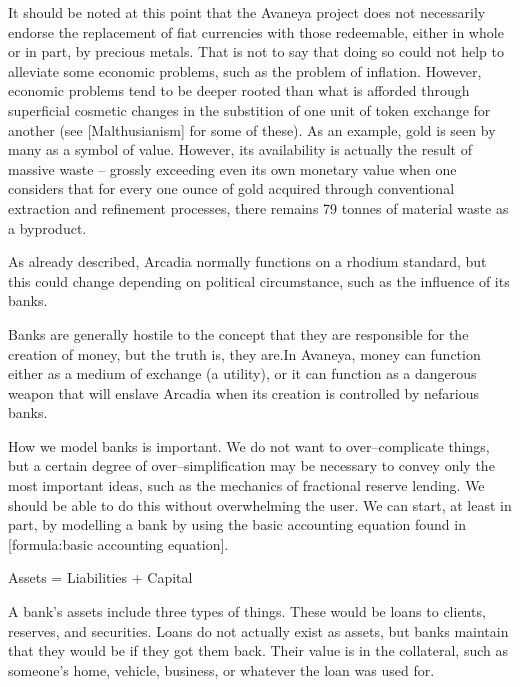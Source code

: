 It should be noted at this point that the Avaneya project does not necessarily endorse the replacement of fiat currencies with those redeemable, either in whole or in part, by precious metals. That is not to say that doing so could not help to alleviate some economic problems, such as the problem of inflation. However, economic problems tend to be deeper rooted than what is afforded through superficial cosmetic changes in the substition of one unit of token exchange for another (see [Malthusianism] for some of these). As an example, gold is seen by many as a symbol of value. However, its availability is actually the result of massive waste -- grossly exceeding even its own monetary value when one considers that for every one ounce of gold acquired through conventional extraction and refinement processes, there remains 79 tonnes of material waste as a byproduct.\footnotecite[oxfam2004]


As already described, Arcadia normally functions on a rhodium standard, but this could change depending on political circumstance, such as the influence of its banks.

Banks are generally hostile to the concept that they are responsible for the creation of money, but the truth is, they are. In Avaneya, money can function either as a medium of exchange (a utility), or it can function as a dangerous weapon that will enslave Arcadia when its creation is controlled by nefarious banks.

How we model banks is important. We do not want to over--complicate things, but a certain degree of over--simplification may be necessary to convey only the most important ideas, such as the mechanics of fractional reserve lending. We should be able to do this without overwhelming the user. We can start, at least in part, by modelling a bank by using the basic accounting equation found in [formula:basic accounting equation].

\crlf
{}
\startformula
Assets = Liabilities + Capital
\stopformula
\crlf

A bank's assets include three types of things. These would be loans to clients, reserves, and securities. Loans do not actually exist as assets, but banks maintain that they would be if they got them back. Their value is in the collateral, such as someone's home, vehicle, business, or whatever the loan was used for.

